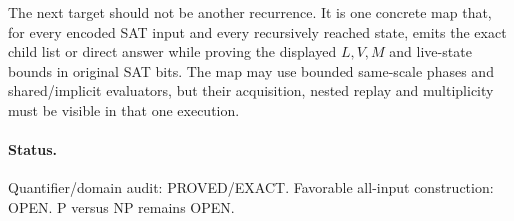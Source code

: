\documentclass[11pt]{article}
\begin{document}
The next target should not be another recurrence.  It is one concrete map
that, for every encoded SAT input and every recursively reached state,
emits the exact child list or direct answer while proving the displayed
$L,V,M$ and live-state bounds in original SAT bits.  The map may use bounded
same-scale phases and shared/implicit evaluators, but their acquisition,
nested replay and multiplicity must be visible in that one execution.

\paragraph{Status.}
Quantifier/domain audit: PROVED/EXACT.  Favorable all-input construction:
OPEN.  P versus NP remains OPEN.

\end{document}
